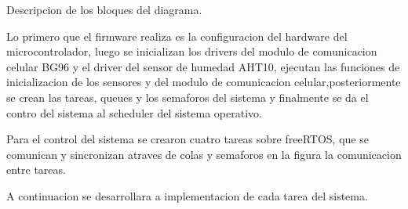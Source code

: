 Descripcion de los bloques del diagrama.

Lo primero que el firmware realiza es la configuracion del hardware del microcontrolador, luego se inicializan los drivers del modulo de comunicacion celular BG96 y el driver del sensor de humedad AHT10, ejecutan las funciones de inicializacion de los sensores y del modulo de comunicacion celular,posteriormente se crean las tareas, queues y los semaforos del sistema y finalmente se da el contro del sistema al scheduler del sistema operativo. 

Para el control del sistema se crearon cuatro tareas sobre freeRTOS, que se comunican y sincronizan atraves de colas y semaforos en la figura la comunicacion entre tareas.

A continuacion se desarrollara a implementacion de cada tarea del sistema.


